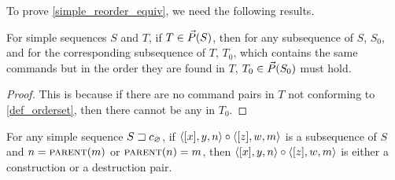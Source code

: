 To prove \cref{simple_reorder_equiv}, we need the following results.

\begin{myclm}\label{subseq_in_orderset}
For simple sequences $S$ and $T$,
if $T\in\vec{P}({S})$, then for any subsequence of $S$, $S_0$,
and for the corresponding subsequence of $T$, $T_0$, which
contains the same commands but in the order they are found in $T$,
$T_0\in\vec{P}({S_0})$ must hold.
\end{myclm}
\begin{proof}
This is because
if there are no command pairs in $T$ not conforming to \cref{def_orderset},
then there cannot be any in $T_0$.
\end{proof}

\begin{mylem}\label{simple_distant_pairs}
For any simple sequence ${S}\sqsupset c_\varnothing$,
if $\langle{[x],y,n}\rangle\circ\langle{[z],w,m}\rangle$ is a subsequence of $S$ and $n=\text{\normalfont\scshape{parent}}(m)$ or $\text{\normalfont\scshape{parent}}(n)=m$,
then $\langle{[x],y,n}\rangle\circ\langle{[z],w,m}\rangle$ is either a construction or a destruction pair.
\end{mylem}
